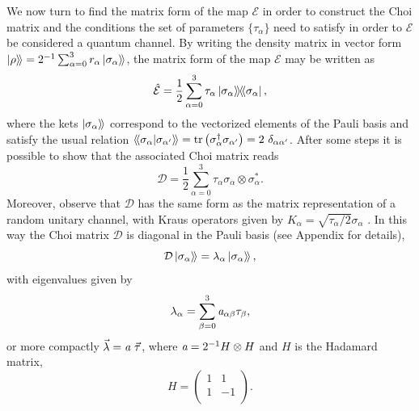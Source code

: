 We now turn to find the matrix form of the map $\mathcal{E}$ in order to construct the Choi matrix and the conditions the set of parameters $\{\tau_{\alpha}\}$ need to satisfy in order to $\mathcal{E}$ be considered a quantum channel. By writing the density matrix in vector form $\mathinner{|{\rho}\rangle \! \rangle}=2^{-1}\sum_{\alpha=0}^{3} r_{\alpha} \mathinner{|{\sigma_{\alpha}}\rangle \! \rangle}$, the matrix form of the map $\mathcal{E}$ may be written as
% 
\begin{equation}
\hat{\mathcal{E}} = \frac{1}{2}\sum_{\alpha=0}^{3} \tau_{\alpha} \mathinner{|{\sigma_{\alpha}}\rangle\!\rangle\!\langle\!\langle{\sigma_{\alpha}}|},
\end{equation}
%
where the kets $\mathinner{|{\sigma_{\alpha}}\rangle \! \rangle}$ correspond to the vectorized elements of the Pauli basis and satisfy the usual relation $ \mathinner{\langle\!\langle {{\sigma_{\alpha}}}|{{\sigma_{\alpha'}}}\rangle\!\rangle} = \tr \left(\sigma_{\alpha}^{\dagger} \sigma_{\alpha'}\right) = 2 ~\delta_{\alpha\alpha'}$. After some steps it is possible to show that the associated Choi matrix reads
% 
\begin{equation}
 \mathcal{D} = \frac{1}{2}\sum_{\alpha=0}^{3} \tau_{\alpha} \sigma_{\alpha} \otimes \sigma_{\alpha}^*.
\end{equation}
% 
Moreover, observe that $\mathcal{D}$ has the same form as the matrix representation of a random unitary channel, with Kraus operators given by $K_{\alpha}=\sqrt{\tau_{\alpha}/2}\sigma_{\alpha}$ \cite{CHRUSCINSKI20131425}. In this way the Choi matrix $\mathcal{D}$ is diagonal in the Pauli basis (see Appendix for details),
%
\begin{equation}
 \mathcal{D} \mathinner{|{\sigma_{\alpha}}\rangle \! \rangle}= \lambda_{\alpha} \mathinner{|{\sigma_{\alpha}}\rangle \! \rangle},
\end{equation}
% 
with eigenvalues given by 
% 
\begin{equation}
 \lambda_{\alpha} = \sum_{\beta=0}^3\textit{a}_{\alpha\beta}\tau_{\beta},
\end{equation}
%
or more compactly $\vec{\lambda} = \textit{a}~\vec{\tau}$, where $\textit{a}=2^{-1}H\otimes H$ and $H$ is the Hadamard matrix,
%
\begin{equation}
 H=\begin{pmatrix}
        1 & 1\\
        1 & -1\\
    \end{pmatrix}.
 \label{Hadd_Mat}
\end{equation}
% 

